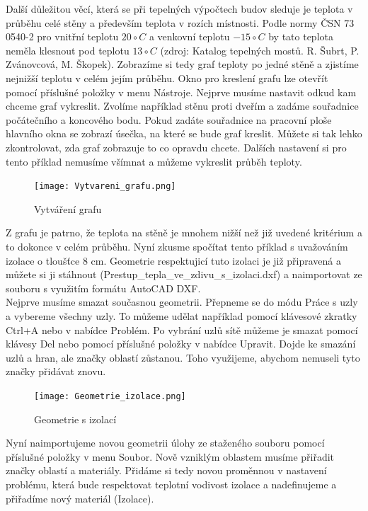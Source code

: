 \documentclass[a4paper, oneside]{article}
\begin{document}
	Další důležitou věcí, která se při tepelných výpočtech budov sleduje je teplota v průběhu celé stěny a především teplota v rozích místnosti. Podle normy ČSN 73 0540-2 pro vnitřní teplotu $20 \circ C$ a venkovní teplotu $-15 \circ C$ by tato teplota neměla klesnout pod teplotu $13 \circ C$ (zdroj: Katalog tepelných mostů. R. Šubrt, P. Zvánovcová, M. Škopek). Zobrazíme si tedy graf teploty po jedné stěně a zjistíme nejnižší teplotu v celém jejím průběhu. Okno pro kreslení grafu lze otevřít pomocí příslušné položky v menu Nástroje. Nejprve musíme nastavit odkud kam chceme graf vykreslit. Zvolíme například stěnu proti dveřím a zadáme souřadnice počátečního a koncového bodu. Pokud zadáte souřadnice na pracovní ploše hlavního okna se zobrazí úsečka, na které se bude graf kreslit. Můžete si tak lehko zkontrolovat, zda graf zobrazuje to co opravdu chcete. Dalších nastavení si pro tento příklad nemusíme všímnat a můžeme vykreslit průběh teploty.\\
	
\begin{figure}[htbp]
\centering
\texttt{[image: Vytvareni\_grafu.png]}\\
\caption{Vytváření grafu}
\end{figure}

	Z grafu je patrno, že teplota na stěně je mnohem nižší než již uvedené kritérium a to dokonce v celém průběhu. Nyní zkusme spočítat tento příklad s uvažováním izolace o tloušťce 8 cm. Geometrie respektujicí tuto izolaci je již připravená a můžete si ji stáhnout (Prestup\_tepla\_ve\_zdivu\_s\_izolaci.dxf) a naimportovat ze souboru s využitím formátu AutoCAD DXF.\\
	
	Nejprve musíme smazat současnou geometrii. Přepneme se do módu Práce s uzly a vybereme všechny uzly. To můžeme udělat například pomocí klávesové zkratky Ctrl+A nebo v nabídce Problém. Po vybrání uzlů sítě můžeme je smazat pomocí klávesy Del nebo pomocí příslušné položky v nabídce Upravit. Dojde ke smazání uzlů a hran, ale značky oblastí zůstanou. Toho využijeme, abychom nemuseli tyto značky přidávat znovu.\\
	
\begin{figure}[htbp]
\centering
\texttt{[image: Geometrie\_izolace.png]}\\
\caption{Geometrie s izolací}
\end{figure}

	Nyní naimportujeme novou geometrii úlohy ze staženého souboru pomocí příslušné položky v menu Soubor. Nově vzniklým oblastem musíme přiřadit značky oblastí a materiály. Přidáme si tedy novou proměnnou v nastavení problému, která bude respektovat teplotní vodivost izolace a nadefinujeme a přiřadíme nový materiál (Izolace).\\
	
\end{document}
